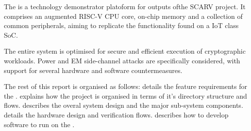 
The \SCARVSOC is a technology demonstrator platoform for outputs ofthe 
SCARV project.
It comprises an augmented RISC-V CPU core, on-chip memory and a
collection of common peripherals, aiming to replicate the functionality
found on a IoT class SoC.

The entire system is optimised for secure and efficient execution of
cryptographic workloads.
Power and EM side-channel attacks are specifically considered,
with support for several hardware and software countermeasures.

The rest of this report is organised as follows:
 details the feature requirements for
the \SCARVSOC.
 explains how the project is organised in terms
of it's directory structure and flows.
 describes the overal system design and the major
sub-system components.
 details the hardware design and verification flows.
 describes how to develop software to run on
the \SCARVSOC.

